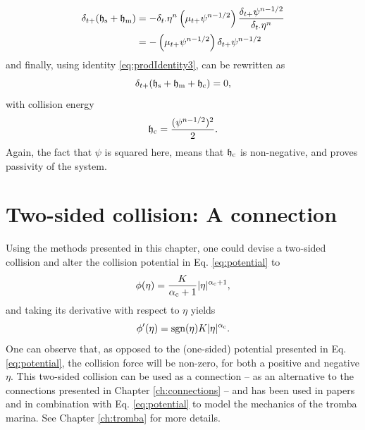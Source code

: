 \begin{align*}
    \delta_{t+}(\mathfrak{h}_\text{s} + \mathfrak{h}_\text{m}) &= - \delta_{t\cdot}\eta^n\left(\mu_{t+} \psi^{n-1/2}\right)\frac{\delta_{t+}\psi^{n-1/2}}{\delta_{t\cdot}\eta^n}\\
    &= -\left(\mu_{t+} \psi^{n-1/2}\right)\delta_{t+}\psi^{n-1/2}
\end{align*}
and finally, using identity \eqref{eq:prodIdentity3}, can be rewritten as
\begin{equation}
    \delta_{t+}(\mathfrak{h}_\text{s} + \mathfrak{h}_\text{m} + \mathfrak{h}_\text{c}) = 0,
\end{equation}
with collision energy
\begin{equation*}
    \mathfrak{h}_\text{c} = \frac{(\psi^{n-1/2})^2}{2}.
\end{equation*}
Again, the fact that $\psi$ is squared here, means that $\mathfrak{h}_\text{c}$ is non-negative, and proves passivity of the system. 
\section{Two-sided collision: A connection}\label{sec:twoSidedCollision}

% 

Using the methods presented in this chapter, one could devise a two-sided collision and alter the collision potential in Eq. \eqref{eq:potential} to \cite{Bilbao2019}
\begin{equation}\label{eq:twoSidedPotential}
    \phi(\eta) = \frac{K}{\alpha_{\text{c}}+1}|\eta|^{\alpha_{\text{c}}+1},
\end{equation}
and taking its derivative with respect to $\eta$ yields
\begin{equation}
    \phi'(\eta) = \text{sgn}(\eta)K|\eta|^{\alpha_{\text{c}}}.
\end{equation}
One can observe that, as opposed to the (one-sided) potential presented in Eq. \eqref{eq:potential}, the collision force will be non-zero, for both a positive and negative $\eta$. This two-sided collision can be used as a connection -- as an alternative to the connections presented in Chapter \ref{ch:connections} -- and has been used in papers \citeP[D] and \citeP[E] in combination with Eq. \eqref{eq:potential} to model the mechanics of the tromba marina. See Chapter \ref{ch:tromba} for more details.